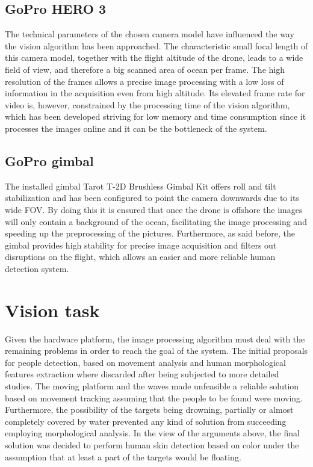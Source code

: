 \subsection{GoPro HERO 3}
The technical parameters of the chosen camera model have influenced the way the vision algorithm has been approached.
The characteristic small focal length of this camera model, together with the flight altitude of the drone, leads to a wide field of view, and therefore a big scanned area of ocean per frame. 
The high resolution of the frames allows a precise image processing with a low loss of information in the acquisition even from high altitude.
Its elevated frame rate for video is, however, constrained by the processing time of the vision algorithm, which has been developed striving for low memory and time consumption since it processes the images online and it can be the bottleneck of the system.

\subsection{GoPro gimbal}
The installed gimbal Tarot T-2D Brushless Gimbal Kit offers roll and tilt stabilization and has been configured to point the camera downwards due to its wide FOV. 
By doing this it is ensured that once the drone is offshore the images will only contain a background of the ocean, facilitating the image processing and speeding up the preprocessing of the pictures.
Furthermore, as said before, the gimbal provides high stability for precise image acquisition and filters out disruptions on the flight, which allows an easier and more reliable human detection system.


\section{Vision task}
Given the hardware platform, the image processing algorithm must deal with the remaining problems in order to reach the goal of the system. 
The initial proposals for people detection, based on movement analysis and human morphological features extraction where discarded after being subjected to more detailed studies. 
The moving platform and the waves made unfeasible a reliable solution based on movement tracking assuming that the people to be found were moving.
Furthermore, the possibility of the targets being drowning, partially or almost completely covered by water prevented any kind of solution from succeeding employing morphological analysis. 
In the view of the arguments above, the final solution was decided to perform human skin detection based on color under the assumption that at least a part of the targets would be floating. 


